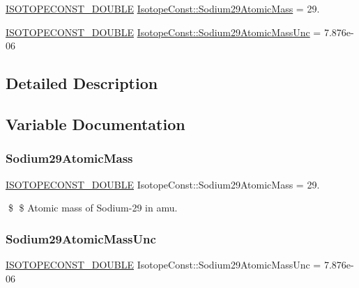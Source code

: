 \begin{DoxyCompactItemize}
\item 
\mbox{\hyperlink{group___isotope_const-_macros_ga8f45a7272ce02c0b4c65c44636ed719a}{I\+S\+O\+T\+O\+P\+E\+C\+O\+N\+S\+T\+\_\+\+D\+O\+U\+B\+LE}} \mbox{\hyperlink{group___isotope_const-_sodium-_na29_gab30a40e34a5b18c9a82317832dd9e85d}{Isotope\+Const\+::\+Sodium29\+Atomic\+Mass}} = 29.
\item 
\mbox{\hyperlink{group___isotope_const-_macros_ga8f45a7272ce02c0b4c65c44636ed719a}{I\+S\+O\+T\+O\+P\+E\+C\+O\+N\+S\+T\+\_\+\+D\+O\+U\+B\+LE}} \mbox{\hyperlink{group___isotope_const-_sodium-_na29_ga3a3cf59d498e79a4f9e2cb259756117d}{Isotope\+Const\+::\+Sodium29\+Atomic\+Mass\+Unc}} = 7.\+876e-\/06
\end{DoxyCompactItemize}


\subsection{Detailed Description}


\subsection{Variable Documentation}
\mbox{\label{group___isotope_const-_sodium-_na29_gab30a40e34a5b18c9a82317832dd9e85d}} 
\subsubsection{\texorpdfstring{Sodium29\+Atomic\+Mass}{Sodium29AtomicMass}}
{\footnotesize\ttfamily \mbox{\hyperlink{group___isotope_const-_macros_ga8f45a7272ce02c0b4c65c44636ed719a}{I\+S\+O\+T\+O\+P\+E\+C\+O\+N\+S\+T\+\_\+\+D\+O\+U\+B\+LE}} Isotope\+Const\+::\+Sodium29\+Atomic\+Mass = 29.}

\$ \$ Atomic mass of Sodium-\/29 in amu. \mbox{\label{group___isotope_const-_sodium-_na29_ga3a3cf59d498e79a4f9e2cb259756117d}} 
\subsubsection{\texorpdfstring{Sodium29\+Atomic\+Mass\+Unc}{Sodium29AtomicMassUnc}}
{\footnotesize\ttfamily \mbox{\hyperlink{group___isotope_const-_macros_ga8f45a7272ce02c0b4c65c44636ed719a}{I\+S\+O\+T\+O\+P\+E\+C\+O\+N\+S\+T\+\_\+\+D\+O\+U\+B\+LE}} Isotope\+Const\+::\+Sodium29\+Atomic\+Mass\+Unc = 7.\+876e-\/06}

